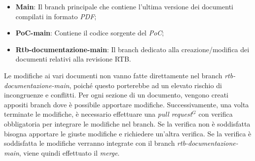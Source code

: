 \begin{itemize}
\item \textbf{Main}: Il branch principale che contiene l'ultima versione dei documenti compilati in formato \emph{PDF};
\item \textbf{PoC-main}: Contiene il codice sorgente del \emph{PoC};
\item \textbf{Rtb-documentazione-main}: Il branch dedicato alla creazione/modifica dei documenti relativi alla revisione RTB.
\end{itemize}
    Le modifiche ai vari documenti non vanno fatte direttamente nel branch \emph{rtb-documentazione-main},
    poiché questo porterebbe ad un elevato rischio di incongruenze e conflitti. Per ogni sezione di un documento, vengono
    creati appositi branch dove è possibile apportare modifiche. Successivamente, una volta terminate le modifiche, è necessario
    effettuare una \emph{pull request}$^{G}$ con verifica obbligatoria per integrare le modifiche nel branch. Se la verifica non è
    soddisfatta bisogna apportare le giuste modifiche e richiedere un'altra verifica. Se la verifica è
    soddisfatta le modifiche verranno integrate con il branch \emph{rtb-documentazione-main}, viene quindi effettuato il \emph{merge}. 